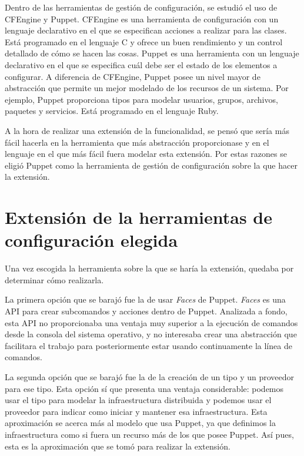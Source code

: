 Dentro de las herramientas de gestión de configuración, se estudió el uso de CFEngine y Puppet. CFEngine es una herramienta de configuración con un lenguaje declarativo en el que se especifican acciones a realizar para las clases. Está programado en el lenguaje C y ofrece un buen rendimiento y un control detallado de cómo se hacen las cosas. Puppet es una herramienta con un lenguaje declarativo en el que se especifica cuál debe ser el estado de los elementos a configurar. A diferencia de CFEngine, Puppet posee un nivel mayor de abstracción que permite un mejor modelado de los recursos de un sistema. Por ejemplo, Puppet proporciona tipos para modelar usuarios, grupos, archivos, paquetes y servicios. Está programado en el lenguaje Ruby.

A la hora de realizar una extensión de la funcionalidad, se pensó que sería más fácil hacerla en la herramienta que más abstracción proporcionase y en el lenguaje en el que más fácil fuera modelar esta extensión. Por estas razones se eligió Puppet como la herramienta de gestión de configuración sobre la que hacer la extensión.


\section{Extensión de la herramientas de configuración elegida}

Una vez escogida la herramienta sobre la que se haría la extensión, quedaba por determinar cómo realizarla.

La primera opción que se barajó fue la de usar \emph{Faces} de Puppet. \emph{Faces} es una API para crear subcomandos y acciones dentro de Puppet. Analizada a fondo, esta API no proporcionaba una ventaja muy superior a la ejecución de comandos desde la consola del sistema operativo, y no interesaba crear una abstracción que facilitara el trabajo para posteriormente estar usando continuamente la línea de comandos.

La segunda opción que se barajó fue la de la creación de un tipo y un proveedor para ese tipo. Esta opción sí que presenta una ventaja considerable: podemos usar el tipo para modelar la infraestructura distribuida y podemos usar el proveedor para indicar como iniciar y mantener esa infraestructura. Esta aproximación se acerca más al modelo que usa Puppet, ya que definimos la infraestructura como si fuera un recurso más de los que posee Puppet. Así pues, esta es la aproximación que se tomó para realizar la extensión.
